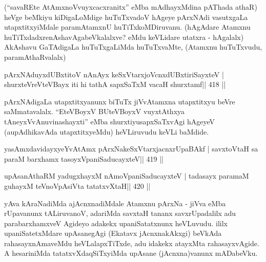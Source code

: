 \begin{artha}
(``savaREte AtAmxnoVvuyxcacxranitx'' eMba mAdhayxMdina pAThada athaR) 
heVge beMkiyu kiDigaLoMdige huTuTxvadoV hAgeye pArxNAdi vasutxgaLa 
utapxtitxyiMdale paramAtamxnU huTiTxkoMDiruvanu. (hAgAdare Atamxnu 
huTiTxdadxre\break nAshavAgabeVkalalxve? eMdu keVLidare utatxra - hAgalalx)  \mdash  AkAshavu GaTAdigaLa huTuTxgaLiMda huTuTxvaMte, (Atamxnu huTuTxvudu, paramAthaRvalalx)
\end{artha}



\begin{shl}
pArxNAduyxdUBxtitoV nAnAyx keSxVtarxjoVcnxdUBxtiriSayxteV |
shurxteVreVteVBayx iti hi tathA sapxSaTxM vacaH shurxtamf\hfill || 418 ||
\end{shl}

\begin{artha}
pArxNAdigaLa utapxtitxyanunx biTuTx jiVvAtamxna utapxtitxyu beVre  saMmatavalalx. ``EteVBoyxV BUteVBoyxV vuyxtAthxya tAneyxVvAnuvinashayxti'' eMba shurxtiyu\break sapxSaTxvAgi hAgeyeV (aupAdhikavAda utapxtitxyeMdu) heVLiruvudu keVLi baMdide.
\end{artha}


\begin{shl}
yasAmxdavidayxyeYvA\s\s tAmx pArxNakeSxVtarxjacnxrUpaBAkf |
savxtoV\s taH sa paraM barxhamx tasoyxVpaniSaducayxteV\hfill || 419 ||
\end{shl}

\begin{shl}
upAsanAthaRM yadugxhayxM nAmoVpaniSaducayxteV |
tadasayx paramaM guhayxM teVnoVpAsiVta tatatxvXtaH\hfill || 420 ||
\end{shl}

\begin{artha}
yAva kAraNadiMda ajAcnxnadiMdale Atamxnu pArxNa - jiVva eMba rUpavanunx tALiruvanoV, adariMda savxtaH tananx savxrUpadalilx adu  parabarxhamxveV Agideyo adakekx upaniSatatxnunx heVLuvudu. ililx  upaniSatetxMdare upAsanegAgi (Ekatavx jAcnxnakAkxgi) beVkAda rahasayxnAmaveMdu heVLalapxTiTxde, adu idakekx atayxMta rahasayxvAgide. A  hesariniMda tatatxvXdaqSiTxyiMda upAsane (jAcnxna)vanunx mADabeVku.
\end{artha}


